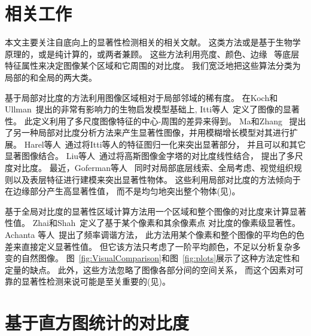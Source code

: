 \documentclass[final]{cvpr}
\begin{document}
\section{相关工作}
\label{sec:RelatedWorks}

本文主要关注自底向上的显著性检测相关的相关文献。
这类方法或是基于生物学原理的，或是纯计算的，或两者兼顾。
这些方法利用亮度、颜色、边缘~\cite{09cvpr/Achanta_FTSaliency}
等底层特征属性来决定图像某个区域和它周围的对比度。
我们宽泛地把这些算法分类为局部的和全局的两大类。

基于局部对比度的方法利用图像区域相对于局部邻域的稀有度。
在Koch和Ullman~\cite{85HN/KochVisualAttention}提出的非常有影响力的生物启发模型基础上,
Itti等人~\cite{98pami/Itti}定义了图像的显著性。
此定义利用了多尺度图像特征的中心-周围的差异来得到。
Ma和Zhang~\cite{03ACMMM/Ma_Contrast-based}
提出了另一种局部对比度分析方法来产生显著性图像，并用模糊增长模型对其进行扩展。
Harel等人~\cite{conf/nips/HarelKP06}通过将Itti等人的特征图归一化来突出显著部分，
并且可以和其它显著图像结合。
Liu等人~\cite{10pami/Liu_Learning}通过将高斯图像金字塔的对比度线性结合，
提出了多尺度对比度。
最近，Goferman等人~\cite{10cvpr/goferman_context}
同时对局部底层线索、全局考虑、视觉组织规则以及表层特征进行建模来突出显著性物体。
这些利用局部对比度的方法倾向于在边缘部分产生高显著性值，
而不是均匀地突出整个物体(见)。

基于全局对比度的显著性区域计算方法用一个区域和整个图像的对比度来计算显著性值。
Zhai和Shah~\cite{06acmmm/ZhaiS_spatiotemporal}定义了基于某个像素和其余像素点
对比度的像素级显著性。
Achanta 等人~\cite{09cvpr/Achanta_FTSaliency}提出了频率调谐方法，
此方法用某个像素和整个图像的平均色的色差来直接定义显著性值。
但它该方法只考虑了一阶平均颜色，不足以分析复杂多变的自然图像。
图~\ref{fig:VisualComparison}和图~\ref{fig:plots}展示了这种方法定性和定量的缺点。
此外，这些方法忽略了图像各部分间的空间关系，
而这个因素对可靠的显著性检测来说可能是至关重要的(见)。


\section{基于直方图统计的对比度}\label{sec:HC}
\end{document}
